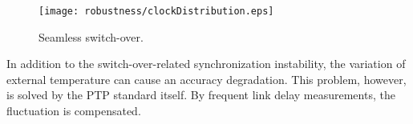 \begin{figure}[t]
\centering
\texttt{[image: robustness/clockDistribution.eps]}
\caption{Seamless switch-over.}
\label{fig:switch-over}
\end{figure}

In addition to the switch-over-related synchronization instability, the variation of external temperature 
can cause an accuracy degradation. This problem, however, is solved by the PTP standard itself. By 
frequent link delay measurements, the fluctuation is compensated. 

